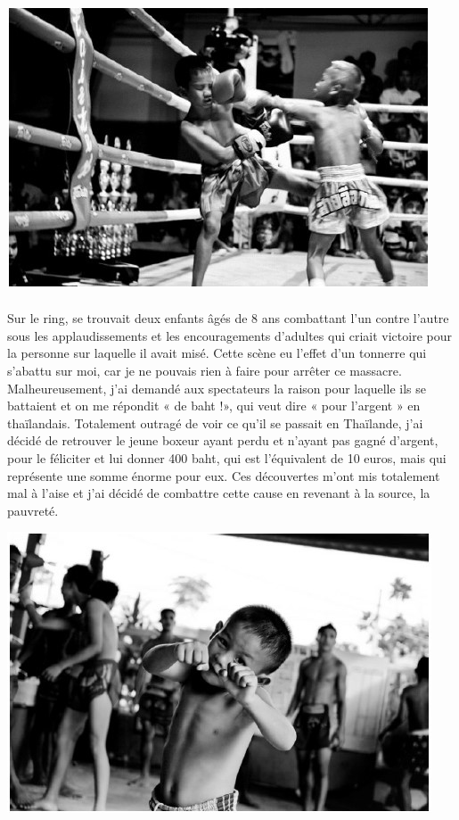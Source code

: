 \begin{center}
\includegraphics[scale=0.7]{Thai2.jpg}
\end{center}

\paragraph{}
Sur le ring, se trouvait deux enfants âgés de 8 ans combattant l'un contre l'autre sous les applaudissements et les encouragements d'adultes qui criait victoire pour la personne sur laquelle il avait misé. Cette scène eu l'effet d'un tonnerre qui s'abattu sur moi, car je ne pouvais rien à faire pour arrêter ce massacre.
Malheureusement, j'ai demandé aux spectateurs la raison pour laquelle ils se battaient et on me répondit « de baht !», qui veut dire « pour l'argent » en thaïlandais. Totalement outragé de voir ce qu'il se passait en Thaïlande, j'ai décidé de retrouver le jeune boxeur ayant perdu et n'ayant pas gagné d'argent, pour le féliciter et lui donner 400 baht, qui est l'équivalent de 10 euros, mais qui représente une somme énorme pour eux.
Ces découvertes m'ont mis totalement mal à l'aise et j'ai décidé de combattre cette cause en revenant à la source, la pauvreté.
\begin{center}
\includegraphics[scale=0.7]{Thai3.jpg}
\end{center}


